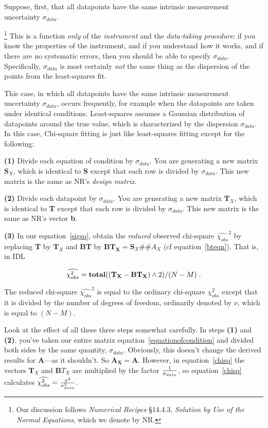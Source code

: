 	Suppose, first, that all datapoints have the same intrinsic
measurement uncertainty $\sigma_{data}$.{\footnote{Our discussion follows
{\it Numerical Recipes} \S 14.4.3, {\it Solution by Use of the Normal
Equations}, which we denote by NR.}   This is a function {\it only}
of the {\it instrument} and the {\it data-taking procedure}: if you know
the properties of the instrument, and if you understand how it works,
and if there are no systematic errors, then you should be able to
specify $\sigma_{data}$. Specifically, $\sigma_{data}$ is most certainly
{\it not} the same thing as the dispersion of the points from the
least-squares fit. 

	This case, in which all datapoints have the same intrinsic
measurement uncertainty $\sigma_{data}$, occurs frequently, for example
when the datapoints are taken under identical conditions.  Least-squares
assumes a Gaussian distribution of datapoints around the true
value, which is characterized by the dispersion $\sigma_{data}$.  In
this case, Chi-square fitting is just like least-squares fitting except
for the following:

	{\bf (1)} Divide each equation of condition by $\sigma_{data}$. 
You are generating a new matrix ${\mathbf S_X}$, which is identical to
{\bf S} except that each row is divided by $\sigma_{data}$.  This new
matrix is the same as NR's {\it design matrix}. 

	{\bf (2)} Divide each datapoint by $\sigma_{data}$.  You are
generating a new matrix ${\mathbf T_X}$, which is identical to {\bf T}
except that each row is divided by $\sigma_{data}$.  This new matrix is
the same as NR's vector {\bf b}. 

	{\bf (3)} In our equation~\ref{sigsq}, obtain the {\it reduced}
observed chi-square $\widehat{\chi_{obs}}^2$ by replacing {\bf T} by
${\mathbf T_X}$ and {\bf BT} by $\mathbf{BT_X} = {\mathbf S_X \#\#
A_X}$ (cf equation~\ref{bteqn}).  That is, in IDL

\begin{equation}
\label{chisq}
\widehat{\chi_{obs}^2} = {\bf total}( ({\bf T_X - BT_X}) \wedge 2 )/(N-M) \; . 
\end{equation}

\noindent The reduced chi-square $\widehat{\chi_{obs}}^2$ is equal to the
ordinary chi-square $\chi_{obs}^2$ except that it is divided by the
number of degrees of freedom, ordinarily denoted by $\nu$, which is
equal to $(N-M)$. 

	Look at the effect of all these three steps somewhat carefully. 
In steps {\bf (1)} and {\bf (2)}, you've taken our entire matrix
equation~\ref{equationofcondition} and divided both sides by the same
quantity, $\sigma_{data}$.  Obviously, this doesn't change the derived
results for {\bf A}---as it shouldn't.  So $\mathbf{A_X} = \mathbf{A}$. 
However, in equation~\ref{chisq} the vectors ${\mathbf T_X}$ and
${\mathbf BT_X}$ are multiplied by the factor $1 \over \sigma_{data}$,
so equation~\ref{chisq} calculates $\widehat{\chi_{obs}^2} =
{\sigma^2 \over \sigma_{data}^2}$. 

}
